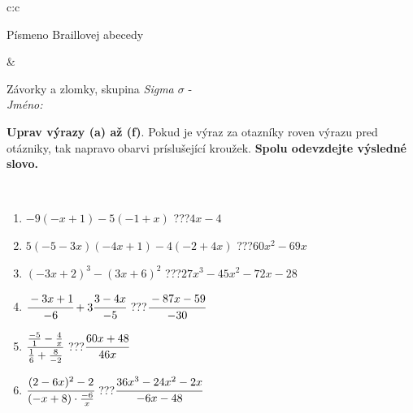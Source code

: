 \documentclass[10pt]{report}
\begin{document}
\begin{tabular}{c:c}
\begin{minipage}[c][104.5mm][t]{0.5\linewidth}
\begin{center}
\begin{minipage}{0.20\linewidth}
\begin{center}
{\small Písmeno Braillovej abecedy}
\end{center}
\end{minipage}
\end{center}
\end{minipage}
&
\begin{minipage}[c][104.5mm][t]{0.5\linewidth}
\begin{center}
\vspace{7mm}
{\huge Závorky a zlomky, skupina \textit{Sigma $\sigma$} -}\\[5mm]
\textit{Jméno:}\phantom{xxxxxxxxxxxxxxxxxxxxxxxxxxxxxxxxxxxxxxxxxxxxxxxxxxxxxxxxxxxxxxxxx}\\[5mm]
\begin{minipage}{0.95\linewidth}
\begin{center}
\textbf{Uprav výrazy (a) až (f)}. Pokud je výraz za otazníky roven výrazu pred otázniky, tak napravo obarvi príslušející kroužek. \textbf{Spolu odevzdejte výsledné slovo.}
\end{center}
\end{minipage}
\\[1mm]
\begin{minipage}{0.79\linewidth}
\begin{center}
\begin{varwidth}{\linewidth}
\begin{enumerate}
\normalsize
\item $-9(-x+1)-5(-1+x)$\quad \dotfill\; ???\;\dotfill \quad $4x-4$
\item $5(-5-3x)(-4x+1)-4(-2+4x)$\quad \dotfill\; ???\;\dotfill \quad $60x^2-69x$
\item $(-3x+2)^3-(3x+6)^2$\quad \dotfill\; ???\;\dotfill \quad $27x^3-45x^2-72x-28$
\item $\cfrac{-3x+1}{-6}+3\cfrac{3-4x}{-5}$\quad \dotfill\; ???\;\dotfill \quad $\cfrac{-87x-59}{-30}$
\item $\cfrac{\frac{-5}{1}-\frac{4}{x}}{\frac{1}{6}+\frac{8}{-2}}$\quad \dotfill\; ???\;\dotfill \quad $\cfrac{60x+48}{46x}$
\item $\cfrac{(2-6x)^2-2}{(-x+8)\cdot\frac{-6}{x}}$\quad \dotfill\; ???\;\dotfill \quad $\cfrac{36x^3-24x^2-2x}{-6x-48}$
\end{enumerate}
\end{varwidth}
\end{center}
\end{minipage}
\begin{minipage}{0.20\linewidth}
\begin{center}

\end{center}
\end{minipage}
\end{center}
\end{minipage}
\end{tabular}
\end{document}
